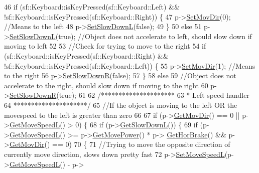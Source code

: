 \begin{DoxyCode}
46     \textcolor{keywordflow}{if} (sf::Keyboard::isKeyPressed(sf::Keyboard::Left) && !sf::Keyboard::isKeyPressed(sf::Keyboard::Right))
       \{
47         p->\hyperlink{classPlayerObject_a6f79723dde4a3eccdd819213114e52a3}{SetMovDir}(0); \textcolor{comment}{//Means to the left}
48         p->\hyperlink{classPlayerObject_a17ffd5b043b80c4070d15c2f92c93852}{SetSlowDownL}(\textcolor{keyword}{false});
49     \}
50     \textcolor{keywordflow}{else}
51         p->\hyperlink{classPlayerObject_a17ffd5b043b80c4070d15c2f92c93852}{SetSlowDownL}(\textcolor{keyword}{true}); \textcolor{comment}{//Object does not accelerate to left, should slow down if moving
       to left}
52 
53     \textcolor{comment}{//Check for trying to move to the right}
54     \textcolor{keywordflow}{if} (sf::Keyboard::isKeyPressed(sf::Keyboard::Right) && !sf::Keyboard::isKeyPressed(sf::Keyboard::Left))
       \{
55         p->\hyperlink{classPlayerObject_a6f79723dde4a3eccdd819213114e52a3}{SetMovDir}(1); \textcolor{comment}{//Means to the right}
56         p->\hyperlink{classPlayerObject_a4b250de8af994ba9c3d7020c440a9d5d}{SetSlowDownR}(\textcolor{keyword}{false});
57     \}
58     \textcolor{keywordflow}{else}
59         \textcolor{comment}{//Object does not accelerate to the right, should slow down if moving to the right}
60         p->\hyperlink{classPlayerObject_a4b250de8af994ba9c3d7020c440a9d5d}{SetSlowDownR}(\textcolor{keyword}{true});
61 
62     \textcolor{comment}{/*********************}
63 \textcolor{comment}{     * Left speed handler}
64 \textcolor{comment}{     *********************/}
65     \textcolor{comment}{//If the object is moving to the left OR the movespeed to the left is greater than zero}
66 
67     \textcolor{keywordflow}{if} (p->\hyperlink{classPlayerObject_a6d7441e0284e6af65a064f5d9781a7a9}{GetMovDir}() == 0 || p->\hyperlink{classPlayerObject_a14c7cacdcf3fc748e18e1ea5968f794a}{GetMoveSpeedL}() > 0) \{
68         \textcolor{keywordflow}{if} (p->\hyperlink{classPlayerObject_a7f7fa1fd6ac9c5dc038ebae46c932a25}{GetSlowDownL}()) \{
69             \textcolor{keywordflow}{if} (p->\hyperlink{classPlayerObject_a14c7cacdcf3fc748e18e1ea5968f794a}{GetMoveSpeedL}() >= p->\hyperlink{classPlayerObject_a0e3039ff401d366e2acd4e3c04577e8a}{GetMovePower}() * p->
      \hyperlink{classPlayerObject_a4a519b15f12e06aa35ae9796c30fac08}{GetHorBrake}() && p->\hyperlink{classPlayerObject_a6d7441e0284e6af65a064f5d9781a7a9}{GetMovDir}() == 0)
70             \{
71                 \textcolor{comment}{//Trying to move the opposite direction of currently move direction, slows down pretty fast}
72                 p->\hyperlink{classPlayerObject_a60999058bc5ed47cbbd52c468a400c5f}{SetMoveSpeedL}(p->\hyperlink{classPlayerObject_a14c7cacdcf3fc748e18e1ea5968f794a}{GetMoveSpeedL}() - p->

\end{DoxyCode}
